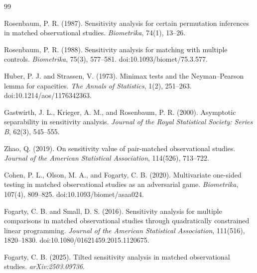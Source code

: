 \documentclass{article}
\begin{document}
\begin{thebibliography}{99}

   Rosenbaum, P. R. (1987). Sensitivity analysis for certain permutation inferences in matched observational studies. \emph{Biometrika}, 74(1), 13--26.

   Rosenbaum, P. R. (1988). Sensitivity analysis for matching with multiple controls. \emph{Biometrika}, 75(3), 577--581. doi:10.1093/biomet/75.3.577.

   Huber, P. J. and Strassen, V. (1973). Minimax tests and the Neyman--Pearson lemma for capacities. \emph{The Annals of Statistics}, 1(2), 251--263. doi:10.1214/aos/1176342363.

   Gastwirth, J. L., Krieger, A. M., and Rosenbaum, P. R. (2000). Asymptotic separability in sensitivity analysis. \emph{Journal of the Royal Statistical Society: Series B}, 62(3), 545--555.

   Zhao, Q. (2019). On sensitivity value of pair-matched observational studies. \emph{Journal of the American Statistical Association}, 114(526), 713--722.

   Cohen, P. L., Olson, M. A., and Fogarty, C. B. (2020). Multivariate one-sided testing in matched observational studies as an adversarial game. \emph{Biometrika}, 107(4), 809--825. doi:10.1093/biomet/asaa024.

   Fogarty, C. B. and Small, D. S. (2016). Sensitivity analysis for multiple comparisons in matched observational studies through quadratically constrained linear programming. \emph{Journal of the American Statistical Association}, 111(516), 1820--1830. doi:10.1080/01621459.2015.1120675.

   Fogarty, C. B. (2025). Tilted sensitivity analysis in matched observational studies. \emph{arXiv:2503.09736}.

\end{thebibliography}
\end{document}
